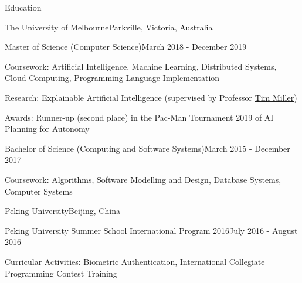 \documentclass{cv}
\begin{document}
\address{
\textbf{Phone} \texttt{<REDACTED>} $\cdot$\space
\textbf{Email} \href{mailto:luo@jiahai.co}{luo@jiahai.co} $\cdot$\space
\textbf{LinkedIn} \href{https://linkedin.com/in/luojiahai/}{in/luojiahai} $\cdot$\space
\textbf{GitHub} \href{https://github.com/luojiahai/}{luojiahai} $\cdot$\space
\textbf{Site} \href{https://luojiahai.com/}{luojiahai.com}
}

\begin{cvsection}{Education}

\begin{cvheading}{The University of Melbourne}{Parkville, Victoria, Australia}
\begin{cvsubheading}{Master of Science (Computer Science)}{March 2018 - December 2019}
\item Coursework: Artificial Intelligence, Machine Learning, Distributed Systems, Cloud Computing, Programming Language Implementation
\item Research: Explainable Artificial Intelligence (supervised by Professor \href{https://eecs.uq.edu.au/profile/9477/tim-miller}{Tim Miller})
\item Awards: Runner-up (second place) in the Pac-Man Tournament 2019 of AI Planning for Autonomy
\end{cvsubheading}
\begin{cvsubheading}{Bachelor of Science (Computing and Software Systems)}{March 2015 - December 2017}
\item Coursework: Algorithms, Software Modelling and Design, Database Systems, Computer Systems
\end{cvsubheading}
\end{cvheading}

\begin{cvheading}{Peking University}{Beijing, China}
\begin{cvsubheading}{Peking University Summer School International Program 2016}{July 2016 - August 2016}
\item Curricular Activities: Biometric Authentication, International Collegiate Programming Contest Training
\end{cvsubheading}
\end{cvheading}

\end{cvsection}
\end{document}
